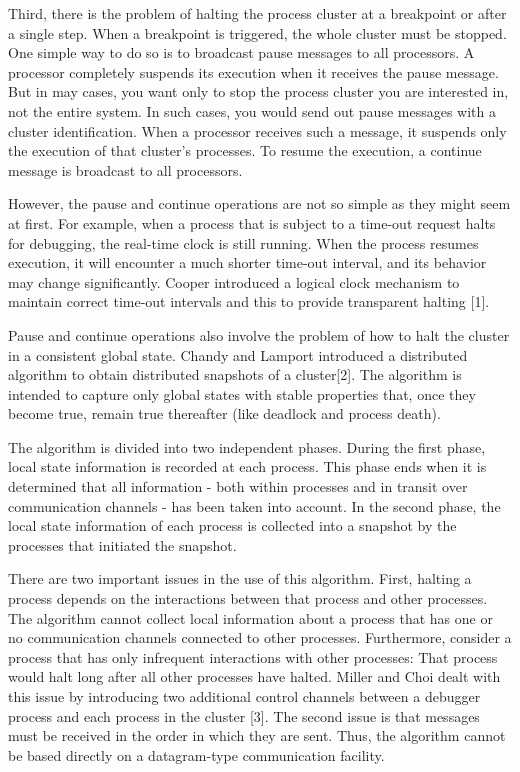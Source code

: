 	Third, there is the problem of halting the process cluster at a breakpoint or after a single step. When a breakpoint is triggered, the whole cluster must be stopped. One simple way to do so is to broadcast pause messages to all processors. A processor completely suspends its execution when it receives the pause message. But in may cases, you want only to stop the process cluster you are interested in, not the entire system. In such cases, you would send out pause messages with a cluster identification. When a processor receives such a message, it suspends only the execution of that cluster's processes. To resume the execution, a continue message is broadcast to all processors.
	
	However, the pause and continue operations are not so simple as they might seem at first. For example, when a process that is subject to a time-out request halts for debugging, the real-time clock is still running. When the process resumes execution, it will encounter a much shorter time-out interval, and its behavior may change significantly. Cooper introduced a logical clock mechanism to maintain correct time-out intervals and this to provide transparent halting [1].
	
	Pause and continue operations also involve the problem of how to halt the cluster in a consistent global state. Chandy and Lamport introduced a distributed algorithm to obtain distributed snapshots of a cluster[2]. The algorithm is intended to capture only global states with stable properties that, once they become true, remain true thereafter (like deadlock and process death).
	
	The algorithm is divided into two independent phases. During the first phase, local state information is recorded at each process. This phase ends when it is determined that all information - both within processes and in transit over communication channels - has been taken into account. In the second phase, the local state information of each process is collected into a snapshot by the processes that initiated the snapshot.
	
	There are two important issues in the use of this algorithm. First, halting a process depends on the interactions between that process and other processes. The algorithm cannot collect local information about a process that has one or no communication channels connected to other processes. Furthermore, consider a process that has only infrequent interactions with other processes: That process would halt long after all other processes have halted. Miller and Choi dealt with this issue by introducing two additional control channels between a debugger process and each process in the cluster [3]. The second issue is that messages must be received in the order in which they are sent. Thus, the algorithm cannot be based directly on a datagram-type communication facility.	